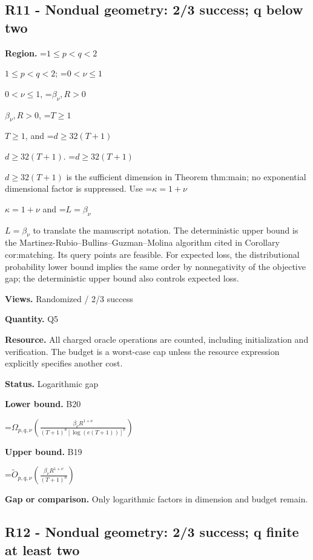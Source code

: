 \documentclass[10pt,a4paper]{article}
\newcommand{\AtlasMath}[1]{\par\begingroup\centering\setbox0=\hbox{$\displaystyle #1$}\ifdim\wd0>1.4\linewidth\typeout{ATLAS WIDE FORMULA: \the\wd0}\fi\ifdim\wd0>\linewidth\resizebox{\linewidth}{!}{\box0}\else\box0\fi\par\endgroup}
\newcommand{\AtlasInlineMath}[1]{\begingroup\setbox0=\hbox{$#1$}\ifdim\wd0>.4\linewidth\endgroup\AtlasMath{#1}\else\endgroup$#1$\fi}
\begin{document}
\subsection{R11 - Nondual geometry: 2/3 success; q below two}


\textbf{Region.} \AtlasInlineMath{1\le p<q<2}; \AtlasInlineMath{0<\nu\le1}, \AtlasInlineMath{\beta_\nu,R>0}, \AtlasInlineMath{T\ge1}, and \AtlasInlineMath{d\ge32(T+1)}. \AtlasInlineMath{d\ge32(T+1)} is the sufficient dimension in Theorem thm:main; no exponential dimensional factor is suppressed. Use \AtlasInlineMath{\kappa=1+\nu} and \AtlasInlineMath{L=\beta_\nu} to translate the manuscript notation. The deterministic upper bound is the Martinez-Rubio--Bullins--Guzman--Molina algorithm cited in Corollary cor:matching. Its query points are feasible. For expected loss, the distributional probability lower bound implies the same order by nonnegativity of the objective gap; the deterministic upper bound also controls expected loss.



\textbf{Views.} Randomized / 2/3 success



\textbf{Quantity.} Q5



\textbf{Resource.} All charged oracle operations are counted, including initialization and verification. The budget is a worst-case cap unless the resource expression explicitly specifies another cost.



\textbf{Status.} Logarithmic gap



\textbf{Lower bound.} B20



\AtlasMath{\Omega_{p,q,\nu}\!\left(\frac{\beta_\nu R^{1+\nu}}{(T+1)^a[\log(e(T+1))]^\nu}\right)}


\textbf{Upper bound.} B19



\AtlasMath{\widetilde O_{p,q,\nu}\!\left(\frac{\beta_\nu R^{1+\nu}}{(T+1)^a}\right)}


\textbf{Gap or comparison.} Only logarithmic factors in dimension and budget remain.



\subsection{R12 - Nondual geometry: 2/3 success; q finite at least two}
\end{document}
